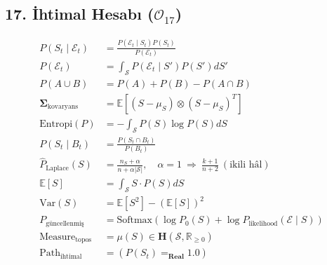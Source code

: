 \documentclass[11pt, a4paper]{article}
\begin{document}
\subsection{17. İhtimal Hesabı ($\mathcal{O}_{17}$)}
\begin{align}
P(S_t \mid \mathcal{E}_t) &= \frac{P(\mathcal{E}_t \mid S_t) P(S_t)}{P(\mathcal{E}_t)} \\
P(\mathcal{E}_t) &= \int_{\mathcal{S}} P(\mathcal{E}_t \mid S') P(S') dS' \\
P(A \cup B) &= P(A) + P(B) - P(A \cap B) \\
\mathbf{\Sigma}_{\text{kovaryans}} &= \mathbb{E}\left[ (S - \mu_S) \otimes (S - \mu_S)^T \right] \\
\text{Entropi}(P) &= -\int_{\mathcal{S}} P(S) \log P(S) dS \\
P(S_t \mid B_t) &= \frac{P(S_t \cap B_t)}{P(B_t)} \\
\hat{P}_{\text{Laplace}}(S) &= \frac{n_S + \alpha}{n + \alpha |\mathcal{S}|}, \quad \alpha = 1 \ \Rightarrow \ \frac{k+1}{n+2} \ (\text{ikili hâl}) \\
\mathbb{E}[S] &= \int_{\mathcal{S}} S \cdot P(S) dS \\
\text{Var}(S) &= \mathbb{E}[S^2] - (\mathbb{E}[S])^2 \\
P_{\text{güncellenmiş}} &= \text{Softmax}(\log P_0(S) + \log P_{\text{likelihood}}(\mathcal{E} \mid S)) \\
\text{Measure}_{\text{topos}} &= \mu(S) \in \mathbf{H}(\mathcal{S}, \mathbb{R}_{\ge 0}) \\
\text{Path}_{\text{ihtimal}} &= (P(S_t) =_{\mathbf{Real}} 1.0)
\end{align}
\end{document}

